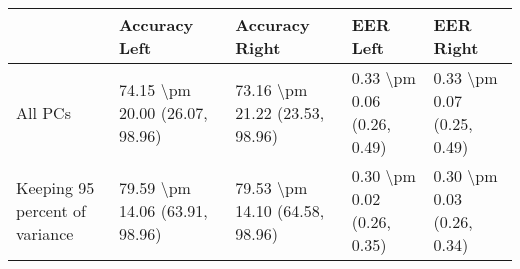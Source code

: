 \begin{tabular}{lllll}
\toprule
{} &                   Accuracy Left &                  Accuracy Right &                    EER Left &                   EER Right \\
\midrule
All PCs                        &  74.15 \textbackslash pm 20.00 (26.07, 98.96) &  73.16 \textbackslash pm 21.22 (23.53, 98.96) &  0.33 \textbackslash pm 0.06 (0.26, 0.49) &  0.33 \textbackslash pm 0.07 (0.25, 0.49) \\
Keeping 95 percent of variance &  79.59 \textbackslash pm 14.06 (63.91, 98.96) &  79.53 \textbackslash pm 14.10 (64.58, 98.96) &  0.30 \textbackslash pm 0.02 (0.26, 0.35) &  0.30 \textbackslash pm 0.03 (0.26, 0.34) \\
\bottomrule
\end{tabular}
